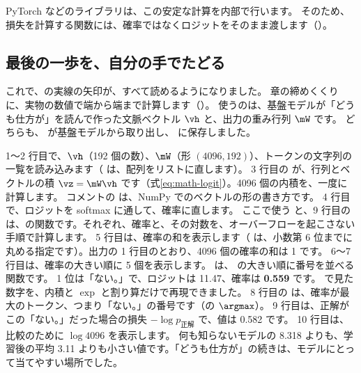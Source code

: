 PyTorch などのライブラリは、この安定な計算を内部で行います。
そのため、損失を計算する関数には、確率ではなくロジットをそのまま渡します（）。

\subsection*{最後の一歩を、自分の手でたどる}

これで、の実線の矢印が、すべて読めるようになりました。
章の締めくくりに、実物の数値で端から端まで計算します（）。
使うのは、基盤モデルが「どうも仕方が」を読んで作った文脈ベクトル $\vh$ と、出力の重み行列 $\mW$ です。
どちらも、 が基盤モデルから取り出し、 に保存しました。

\providecommand{\mathneedspace}[1]{\par\penalty0\relax\ifdim\pagetotal<\pagegoal\ifdim\dimexpr\pagegoal-\pagetotal\relax<#1\relax\newpage\fi\fi}
\mathneedspace{14\baselineskip}

1〜2 行目で、$\vh$（192 個の数）、$\mW$（形 $(4096,192)$）、トークンの文字列の一覧を読み込みます（ は、配列をリストに直します）。
3 行目の  が、行列とベクトルの積 $\vz=\mW\vh$ です（式\eqref{eq:math-logit}）。4096 個の内積を、一度に計算します。
コメントの  は、NumPy でのベクトルの形の書き方です。
4 行目で、ロジットを softmax に通して、確率に直します。
ここで使う  と、9 行目の  は、の関数です。それぞれ、確率と、その対数を、オーバーフローを起こさない手順で計算します。
5 行目は、確率の和を表示します（ は、小数第 6 位までに丸める指定です）。出力の 1 行目のとおり、4096 個の確率の和は 1 です。
6〜7 行目は、確率の大きい順に 5 個を表示します。 は、 の大きい順に番号を並べる関数です。
1 位は「ない。」で、ロジットは 11.47、確率は \textbf{0.559} です。
で見た数字を、内積と $\exp$ と割り算だけで再現できました。
8 行目の  は、確率が最大のトークン、つまり「ない。」の番号です（の $\argmax$）。
9 行目は、正解がこの「ない。」だった場合の損失 $-\log p_{\text{正解}}$ で、値は 0.582 です。
10 行目は、比較のために $\log 4096$ を表示します。
何も知らないモデルの 8.318 よりも、学習後の平均 3.11 よりも小さい値です。「どうも仕方が」の続きは、モデルにとって当てやすい場所でした。

